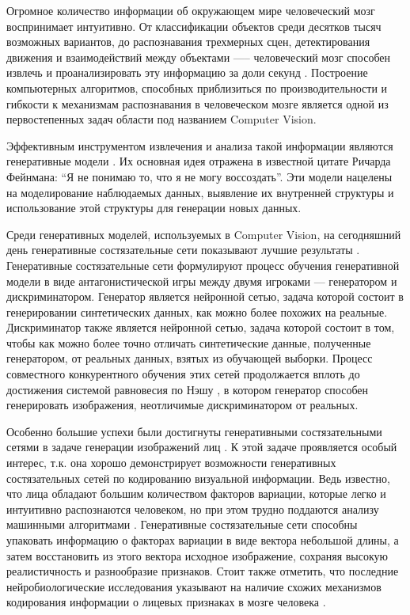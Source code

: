 
Огромное количество информации об окружающем мире человеческий мозг воспринимает интуитивно. 
От классификации объектов среди десятков тысяч возможных вариантов, до распознавания трехмерных сцен, детектирования движения и взаимодействий между объектами —-- человеческий мозг способен извлечь и проанализировать эту информацию за доли секунд \cite{dicarlo2012brain}. 
Построение компьютерных алгоритмов, способных приблизиться по производительности и гибкости к механизмам распознавания в человеческом мозге является одной из первостепенных задач области под названием Computer Vision.

Эффективным инструментом извлечения и анализа такой информации являются генеративные модели \cite{jebara2012machine}. 
Их основная идея отражена в известной цитате Ричарда Фейнмана: “Я не понимаю то, что я не могу воссоздать”. 
Эти модели нацелены на моделирование наблюдаемых данных, выявление их внутренней структуры и использование этой структуры для генерации новых данных.

Среди генеративных моделей, используемых в Computer Vision, на сегодняшний день генеративные состязательные сети показывают  лучшие результаты \cite{generative2020survey}. 
Генеративные состязательные сети \cite{goodfellow2014generative} формулируют процесс обучения генеративной модели в виде антагонистической игры между двумя игроками --- генератором и дискриминатором. 
Генератор является нейронной сетью, задача которой состоит в генерировании синтетических данных, как можно более похожих на реальные. 
Дискриминатор также является нейронной сетью, задача которой состоит в том, чтобы как можно более точно отличать синтетические данные, полученные генератором, от реальных данных, взятых из обучающей выборки. 
Процесс совместного конкурентного обучения этих сетей продолжается вплоть до достижения системой равновесия по Нэшу \cite{goodfellow2017nips}, в котором генератор способен генерировать изображения, неотличимые дискриминатором от реальных.

Особенно большие успехи были достигнуты генеративными состязательными сетями в задаче генерации изображений лиц \cite{progressive-growing-gan, StyleGAN, karras2020stylegan2}. 
К этой задаче проявляется особый интерес, т.к. она хорошо демонстрирует возможности генеративных состязательных сетей по кодированию визуальной информации. 
Ведь известно, что лица обладают большим количеством факторов вариации, которые легко и интуитивно распознаются человеком, но при этом трудно поддаются анализу машинными алгоритмами \cite{face2008perception}.
Генеративные состязательные сети способны упаковать информацию о факторах вариации в виде вектора небольшой длины, а затем восстановить из этого вектора исходное изображение, сохраняя  высокую реалистичность и разнообразие признаков. 
Стоит также отметить, что последние нейробиологические исследования указывают на наличие схожих механизмов кодирования информации о лицевых признаках в мозге человека \cite{facial2017code}.

